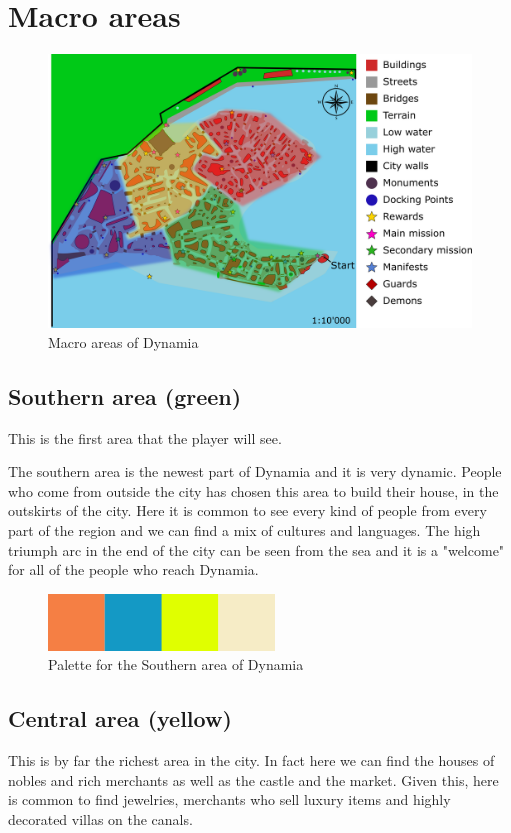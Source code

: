 \section{Macro areas}

\begin{figure}[H]
  \centering
  \includegraphics[width=\textwidth]{Images/Maps/dynamiaAreas}
  \caption{Macro areas of Dynamia}
\end{figure}

\subsection{Southern area (green)}
This is the first area that the player will see.

The southern area is the newest part of Dynamia and it is very dynamic. People who come from outside the city has chosen this area to build their house, in the outskirts of the city. Here it is common to see every kind of people from every part of the region and we can find a mix of cultures and languages. The high triumph arc in the end of the city can be seen from the sea and it is a "welcome" for all of the people who reach Dynamia.

\begin{figure}[H]
  \centering
  \includegraphics[width=6cm]{Images/Palettes/dynamiaSouthernArea}
  \caption{Palette for the Southern area of Dynamia}
\end{figure}

\subsection{Central area (yellow)}
This is by far the richest area in the city. In fact here we can find the houses of  nobles and rich merchants as well as the castle and the market. Given this, here is common to find jewelries, merchants who sell luxury items and highly decorated villas on the canals.

